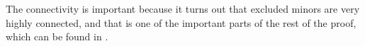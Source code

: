 The connectivity is important because it turns out that excluded minors are very highly connected, and that is one of the important parts of the rest of the proof, which can be found in \cite{solving}.

% 
% 
% 
